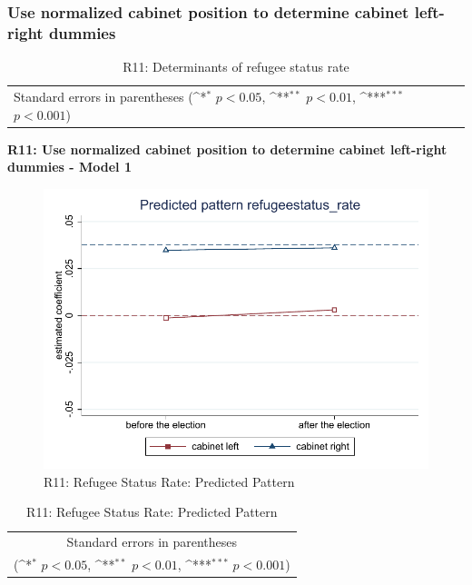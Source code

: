 \documentclass[10pt,a4paper]{scrartcl}
\begin{document}


\clearpage
\FloatBarrier
\subsubsection{Use normalized cabinet position to determine cabinet left-right dummies}
\begin{table}[!ht]\centering
	\renewcommand{\arraystretch}{1.25}
	\small
	\def\sym#1{\ifmmode^{#1}\else\(^{#1}\)\fi}
	\caption{R11: Determinants of refugee status rate}
	\begin{tabular}{l*{3}{c}}
		\hline\hline
		
		\hline\hline
		\multicolumn{4}{l}{\footnotesize Standard errors in parentheses (\sym{*} \(p<0.05\), \sym{**} \(p<0.01\), \sym{***} \(p<0.001\))}\\
	\end{tabular}
\end{table}

\clearpage
\textbf{R11: Use normalized cabinet position to determine cabinet left-right dummies - Model 1}
\begin{figure}[!ht]
	\centering
	\includegraphics[width=1\textwidth]{figures_edited/refugeestatus_rate_graph1_R11.pdf}
	\caption{R11: Refugee Status Rate: Predicted Pattern}
\end{figure}

\begin{table}[!ht]\centering
	\renewcommand{\arraystretch}{1.25}
	\def\sym#1{\ifmmode^{#1}\else\(^{#1}\)\fi}
	\caption{R11: Refugee Status Rate: Predicted Pattern}
	\begin{tabular}{l*{2}{c}}
		\hline\hline
		
		\hline\hline
		\multicolumn{3}{c}{\footnotesize Standard errors in parentheses} \\
		\multicolumn{3}{c}{\footnotesize (\sym{*} \(p<0.05\), \sym{**} \(p<0.01\), \sym{***} \(p<0.001\))}\\
	\end{tabular}
\end{table}
\end{document}
